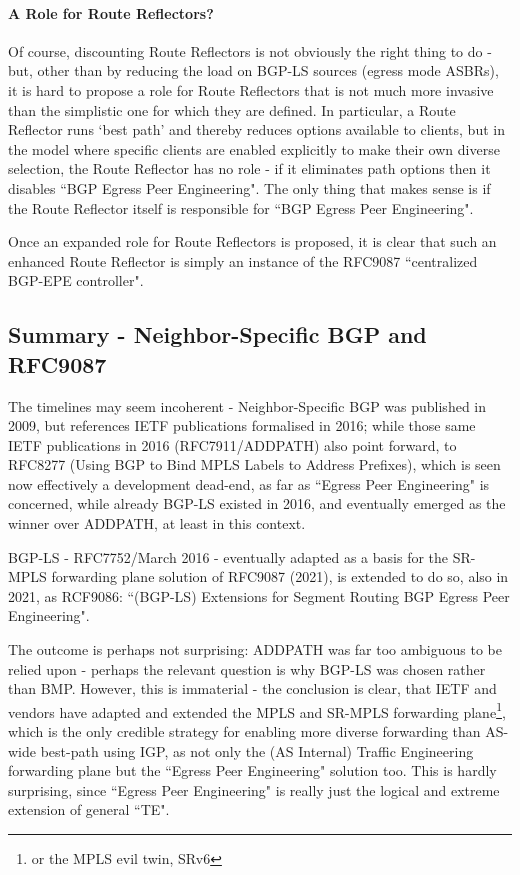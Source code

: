 \paragraph{A Role for Route Reflectors?}
Of course, discounting Route Reflectors is not obviously the right thing to do - but, other than by reducing the load on BGP-LS sources (egress mode ASBRs), it is hard to propose a role for Route Reflectors that is not much more invasive than the simplistic one for which they are defined. In particular, a Route Reflector runs `best path' and thereby reduces options available to clients, but in the model where specific clients are enabled explicitly to make their own diverse selection, the Route Reflector has no role - if it eliminates path options then it disables ``BGP Egress Peer Engineering".  The only thing that makes sense is if the Route Reflector itself is responsible for ``BGP Egress Peer Engineering".


Once an expanded role for Route Reflectors is proposed, it is clear that such an enhanced Route Reflector is simply an instance of the RFC9087 ``centralized BGP-EPE controller".



\subsection{Summary - Neighbor-Speciﬁc BGP and RFC9087}\label{Neighbor-Speciﬁc BGP and RFC9087}

The timelines may seem incoherent - Neighbor-Speciﬁc BGP was published in 2009, but references IETF publications formalised in 2016; while  those same IETF publications in 2016 (RFC7911/ADDPATH) also point forward, to RFC8277 (Using BGP to Bind MPLS Labels to Address Prefixes), which is seen now effectively a development dead-end, as far as ``Egress Peer Engineering" is concerned, while already BGP-LS existed in 2016, and eventually emerged as the winner over ADDPATH, at least in this context.

BGP-LS - RFC7752/March 2016 - eventually adapted as a basis for the SR-MPLS forwarding plane solution of RFC9087 (2021), is extended to do so, also in 2021, as RCF9086: ``(BGP-LS) Extensions for Segment Routing BGP Egress Peer Engineering".

The outcome is perhaps not surprising: ADDPATH was far too ambiguous to be relied upon - perhaps the relevant question is why BGP-LS was chosen rather than BMP.  However, this is immaterial - the conclusion is clear, that IETF and vendors have adapted and extended the MPLS and SR-MPLS forwarding plane\footnote{or the MPLS evil twin, SRv6}, which is the only credible strategy for enabling more diverse forwarding than AS-wide best-path using IGP, as not only the (AS Internal) Traffic Engineering forwarding plane but the ``Egress Peer Engineering" solution too.  This is hardly surprising, since ``Egress Peer Engineering" is really just the logical and extreme extension of general ``TE".

